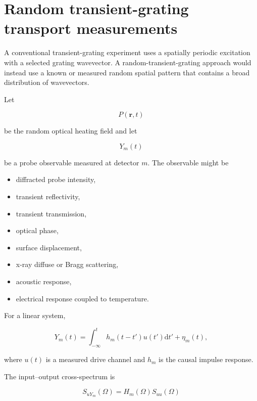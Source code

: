 \documentclass[11pt,letterpaper]{article}
\renewcommand{\dd}{\mathrm{d}}
\begin{document}
\section{Random transient-grating transport measurements}

A conventional transient-grating experiment uses a spatially periodic
excitation with a selected grating wavevector. A random-transient-grating
approach would instead use a known or measured random spatial pattern that
contains a broad distribution of wavevectors.

Let

\begin{equation}
    P(\bm{r},t)
\end{equation}

be the random optical heating field and let

\begin{equation}
    Y_m(t)
\end{equation}

be a probe observable measured at detector $m$. The observable might be

\begin{itemize}[leftmargin=2em]
    \item diffracted probe intensity,
    \item transient reflectivity,
    \item transient transmission,
    \item optical phase,
    \item surface displacement,
    \item x-ray diffuse or Bragg scattering,
    \item acoustic response,
    \item electrical response coupled to temperature.
\end{itemize}

For a linear system,

\begin{equation}
    Y_m(t)
    =
    \int_{-\infty}^{t}
    h_m(t-t')u(t')\dd t'
    +
    \eta_m(t),
    \label{eq:linear_system}
\end{equation}

where $u(t)$ is a measured drive channel and $h_m$ is the causal impulse
response.

The input--output cross-spectrum is

\begin{equation}
    S_{uY_m}(\Omega)
    =
    H_m(\Omega)S_{uu}(\Omega)
\end{equation}
\end{document}
